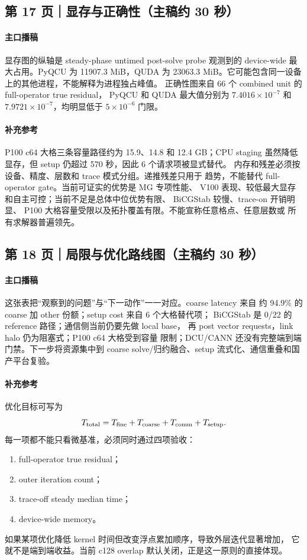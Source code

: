 \documentclass[UTF8,a4paper,11pt,fontset=none]{ctexart}
\begin{document}
\subsection{第 17 页｜显存与正确性（主稿约 30 秒）}

\paragraph{主口播稿}
显存图的纵轴是 steady-phase untimed post-solve probe 观测到的
device-wide 最大占用。PyQCU 为 11907.3 MiB，QUDA 为
23063.3 MiB。它可能包含同一设备上的其他进程，不能解释为进程独占峰值。
正确性图来自 66 个 combined unit 的 full-operator true residual，
PyQCU 和 QUDA 最大值分别为 \(7.4016\times10^{-7}\) 和
\(7.9721\times10^{-7}\)，均明显低于 \(5\times10^{-6}\) 门限。

\paragraph{补充参考}
P100 c64 大格三条容量路径约为 15.9、14.8 和 12.4 GB；CPU staging
虽然降低显存，但 setup 仍超过 570 秒，因此 6 个请求项被显式替代。
内存和残差必须按设备、精度、层数和 trace 模式分组。递推残差只用于
趋势，不能替代 full-operator gate。当前可证实的优势是 MG 专项性能、
V100 表现、较低最大显存和自主可控；当前不足是总体中位优势有限、
BiCGStab 较慢、trace-on 开销明显、
P100 大格容量受限以及拓扑覆盖有限。不能宣称任意格点、任意层数或
所有求解器普遍领先。

\subsection{第 18 页｜局限与优化路线图（主稿约 30 秒）}

\paragraph{主口播稿}
这张表把“观察到的问题”与“下一动作”一一对应。coarse latency 来自
约 94.9\% 的 coarse 加 other 份额；setup cost 来自 6 个大格替代项；
BiCGStab 是 0/22 的 reference 路径；通信侧当前仍要先做 local base，
再 post vector requests，link halo 仍为阻塞式；P100 c64 大格受到容量
限制；DCU/CANN 还没有完整端到端门禁。下一步将资源集中到 coarse
solve/归约融合、setup 流式化、通信重叠和国产平台复验。

\paragraph{补充参考}
优化目标可写为
\[
T_{\rm total}=T_{\rm fine}+T_{\rm coarse}+T_{\rm comm}+T_{\rm setup}.
\]
每一项都不能只看微基准，必须同时通过四项验收：
\begin{enumerate}
  \item full-operator true residual；
  \item outer iteration count；
  \item trace-off steady median time；
  \item device-wide memory。
\end{enumerate}
如果某项优化降低 kernel 时间但改变浮点累加顺序，导致外层迭代显著增加，
它就不是端到端收益。当前 c128 overlap 默认关闭，正是这一原则的直接体现。
\end{document}
